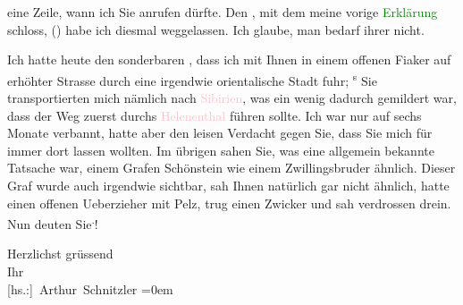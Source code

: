                eine Zeile, wann ich Sie anrufen dürfte. Den \label{K_L03779-3v}\label{K_L03779-3}, mit dem meine vorige \textcolor{green}{Erklärung}\ledrightnote{{$\rightarrow$}\emph{\textcolor{green}{Ein Brief Artur Schnitzlers}}} schloss, {\pb}(\label{K_L03779-4v}\label{K_L03779-4}) habe ich diesmal weggelassen. Ich glaube, man bedarf
               ihrer nicht.\pend
           
\pstart
           Ich hatte heute den sonderbaren \label{K_L03779-5v}\label{K_L03779-5}, dass
               ich mit Ihnen in einem offenen Fiaker auf erhöhter Strasse durch eine irgendwie
               orientalische Stadt fuhr; \substVorne{}\textsuperscript{s }\substDazwischen{}S\substHinten{}ie transportierten mich nämlich nach \textcolor{pink}{Sibirien}\ledrightnote{\textcolor{pink}{Sibirien}}, was ein wenig dadurch gemildert war, dass der Weg zuerst durchs
                  \textcolor{pink}{Helenenthal}\ledrightnote{\textcolor{pink}{Helenental}} führen sollte. Ich war nur auf
               sechs Monate verbannt, hatte aber den leisen Verdacht gegen Sie, dass Sie mich für
               immer dort lassen wollten. Im übrigen sahen Sie, was eine allgemein bekannte Tatsache
               war, einem Grafen Schönstein wie einem Zwillingsbruder ähnlich. Dieser Graf wurde
               auch irgendwie sichtbar, sah Ihnen natürlich gar nicht ähnlich, hatte einen offenen
               Ueberzieher mit Pelz, trug einen Zwicker und sah verdrossen drein. Nun deuten Sie\substVorne{}\textsuperscript{.}\substDazwischen{}!\substHinten{}\pend
           
\pstart
           Herzlichst grüssend{\\[\baselineskip]}Ihr{\\[\baselineskip]}\spacefill\mbox{{[}hs.:{]} Arthur Schnitzler}\pend
           \leftskip=0em{}\endnumbering{}  
      